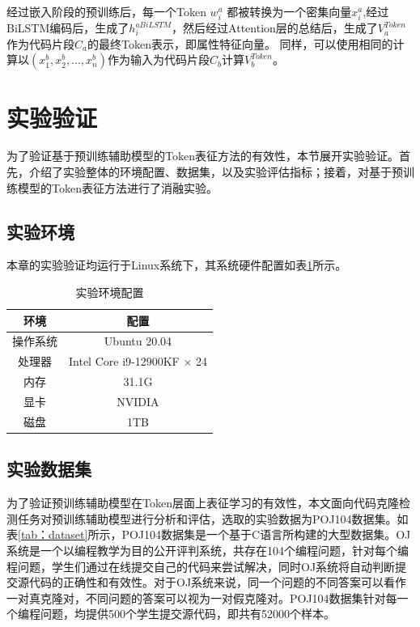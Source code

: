 经过嵌入阶段的预训练后，每一个Token $w_{i}^{a}$ 都被转换为一个密集向量$x_{i}^{a}$,经过BiLSTM编码后，生成了$h_{i}^{aBiLSTM}$，然后经过Attention层的总结后，生成了$V_{a}^{Token}$作为代码片段$C_{a}$的最终Token表示，即属性特征向量。
同样，可以使用相同的计算以$\left( x_{1}^{b},x_{2}^{b},\ldots,x_{n}^{b} \right)$作为输入为代码片段$C_{b}$计算$V_{b}^{Token}$。

\section{实验验证}
\label{sec:TokenExperiment}
为了验证基于预训练辅助模型的Token表征方法的有效性，本节展开实验验证。首先，介绍了实验整体的环境配置、数据集，以及实验评估指标；接着，对基于预训练模型的Token表征方法进行了消融实验。

\subsection{实验环境}
\label{subsec:Environment}
本章的实验验证均运行于Linux系统下，其系统硬件配置如表\ref{tab:environment}所示。
\begin{table}[H]
  \centering
  \caption{实验环境配置} 
  \label{tab:environment}
  \begin{tabular*}{0.5\textwidth}{@{\extracolsep{\fill}}cc}
  \toprule
    环境			&配置		\\
  \midrule
    操作系统		&Ubuntu 20.04 \\
    处理器			&Intel Core i9-12900KF × 24 \\
    内存			  &31.1G \\
    显卡			  &NVIDIA  \\
    磁盘			  &1TB \\
  \bottomrule
  \end{tabular*}
\end{table}

\subsection{实验数据集}
\label{subsec:Dataset}
为了验证预训练辅助模型在Token层面上表征学习的有效性，本文面向代码克隆检测任务对预训练辅助模型进行分析和评估，选取的实验数据为POJ104数据集。如表\ref{tab：dataset}所示，POJ104数据集是一个基于C语言所构建的大型数据集。OJ系统是一个以编程教学为目的公开评判系统，共存在104个编程问题，针对每个编程问题，学生们通过在线提交自己的代码来尝试解决，同时OJ系统将自动判断提交源代码的正确性和有效性。对于OJ系统来说，同一个问题的不同答案可以看作一对真克隆对，不同问题的答案可以视为一对假克隆对。POJ104数据集针对每一个编程问题，均提供500个学生提交源代码，即共有52000个样本。

